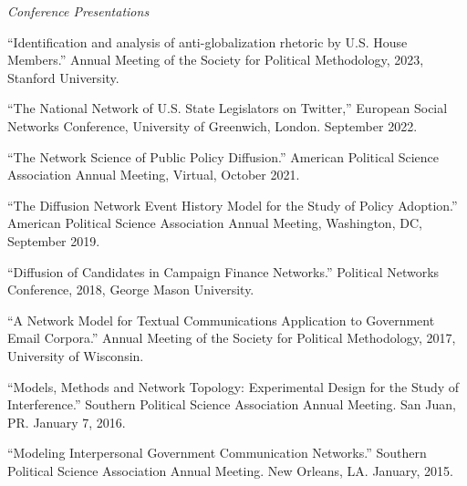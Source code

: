\documentclass[overlapped,line]{res}
\begin{document}
\begin{resume}
\hspace{-1cm} \emph{Conference Presentations}
\begin{etaremune}

\item ``Identification and analysis of anti-globalization rhetoric by U.S. House Members.'' Annual Meeting of the Society for Political Methodology, 2023, Stanford University.
\item ``The National Network of U.S. State Legislators on Twitter,'' European Social Networks Conference, University of Greenwich, London. September 2022. 
\item ``The Network Science of Public Policy Diffusion.'' American Political Science Association Annual Meeting, Virtual, October 2021. 
\item ``The Diffusion Network Event History Model for the Study of Policy Adoption.''  American Political Science Association Annual Meeting, Washington, DC, September 2019. 
\item ``Diffusion of Candidates in Campaign Finance Networks.'' Political Networks Conference, 2018, George Mason University.
\item ``A Network Model for Textual Communications Application to Government Email Corpora.'' Annual Meeting of the Society for Political Methodology, 2017, University of Wisconsin.
\item ``Models, Methods and Network Topology: Experimental Design for the Study of Interference.'' Southern Political Science Association Annual Meeting. San Juan, PR. January 7, 2016. 
\item ``Modeling Interpersonal Government Communication Networks.'' Southern Political Science Association Annual Meeting. New Orleans, LA. January, 2015.
\end{etaremune}


\end{resume}
\end{document}
